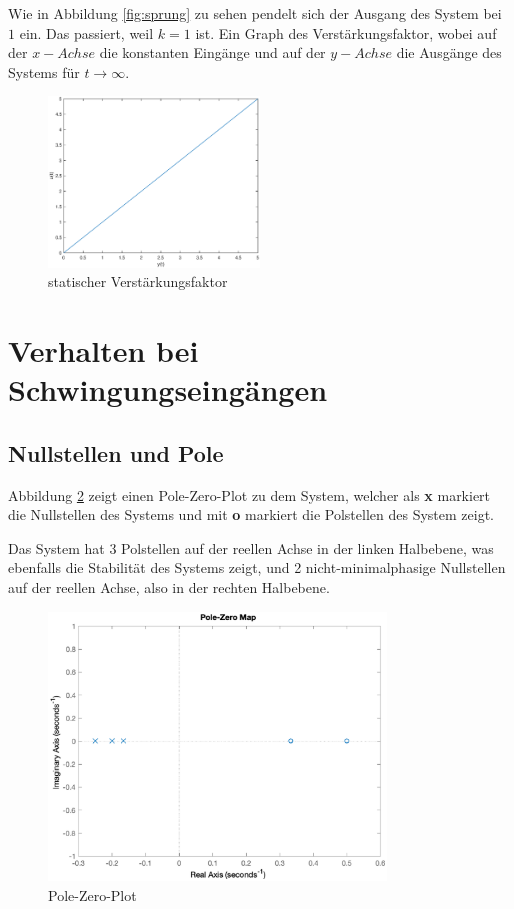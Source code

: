 Wie in Abbildung \ref{fig:sprung} zu sehen pendelt sich der Ausgang des System bei $1$ ein. Das passiert, weil $ k = 1$ ist.
Ein Graph des Verstärkungsfaktor, wobei auf der $x-Achse$ die konstanten Eingänge und auf der $y-Achse$ die Ausgänge des Systems für $t \rightarrow \infty$.

\begin{figure}[H]
    \label{fig:Kennline}
    \centering
    \includegraphics[width=0.5\textwidth]{Bilder/Kennlinie.eps}
    \caption{statischer Verstärkungsfaktor}
\end{figure}


\section{Verhalten bei Schwingungseingängen}

\subsection{Nullstellen und Pole}

Abbildung \ref{fig:pzmap} zeigt einen Pole-Zero-Plot zu dem System, welcher als \textbf{x} markiert die Nullstellen des Systems und mit \textbf{o} markiert die Polstellen des System zeigt.

Das System hat 3 Polstellen auf der reellen Achse in der linken Halbebene, was ebenfalls die Stabilität des Systems zeigt, und 2 nicht-minimalphasige Nullstellen auf der reellen Achse, also in der rechten Halbebene.

\begin{figure}[H]
    \label{fig:pzmap}
    \centering
    \includegraphics[width=0.8\textwidth]{Bilder/PoleZeroPlot.eps}
    \caption{Pole-Zero-Plot}
 \end{figure}


